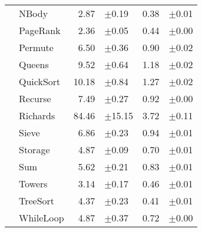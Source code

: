 \begin{tabular}{ll@{\hspace{6pt}}r@{\hspace{3pt}}l@{\hspace{6pt}}r@{\hspace{3pt}}l}
 & NBody & 2.87 & \scriptsize\textcolor{gray!60}{$\pm$0.19} & 0.38 & \scriptsize\textcolor{gray!60}{$\pm$0.01} \\
 & PageRank & 2.36 & \scriptsize\textcolor{gray!60}{$\pm$0.05} & 0.44 & \scriptsize\textcolor{gray!60}{$\pm$0.00} \\
 & Permute & 6.50 & \scriptsize\textcolor{gray!60}{$\pm$0.36} & 0.90 & \scriptsize\textcolor{gray!60}{$\pm$0.02} \\
 & Queens & 9.52 & \scriptsize\textcolor{gray!60}{$\pm$0.64} & 1.18 & \scriptsize\textcolor{gray!60}{$\pm$0.02} \\
 & QuickSort & 10.18 & \scriptsize\textcolor{gray!60}{$\pm$0.84} & 1.27 & \scriptsize\textcolor{gray!60}{$\pm$0.02} \\
 & Recurse & 7.49 & \scriptsize\textcolor{gray!60}{$\pm$0.27} & 0.92 & \scriptsize\textcolor{gray!60}{$\pm$0.00} \\
 & Richards & 84.46 & \scriptsize\textcolor{gray!60}{$\pm$15.15} & 3.72 & \scriptsize\textcolor{gray!60}{$\pm$0.11} \\
 & Sieve & 6.86 & \scriptsize\textcolor{gray!60}{$\pm$0.23} & 0.94 & \scriptsize\textcolor{gray!60}{$\pm$0.01} \\
 & Storage & 4.87 & \scriptsize\textcolor{gray!60}{$\pm$0.09} & 0.70 & \scriptsize\textcolor{gray!60}{$\pm$0.01} \\
 & Sum & 5.62 & \scriptsize\textcolor{gray!60}{$\pm$0.21} & 0.83 & \scriptsize\textcolor{gray!60}{$\pm$0.01} \\
 & Towers & 3.14 & \scriptsize\textcolor{gray!60}{$\pm$0.17} & 0.46 & \scriptsize\textcolor{gray!60}{$\pm$0.01} \\
 & TreeSort & 4.37 & \scriptsize\textcolor{gray!60}{$\pm$0.23} & 0.41 & \scriptsize\textcolor{gray!60}{$\pm$0.01} \\
 & WhileLoop & 4.87 & \scriptsize\textcolor{gray!60}{$\pm$0.37} & 0.72 & \scriptsize\textcolor{gray!60}{$\pm$0.00} \\
\bottomrule
\end{tabular}